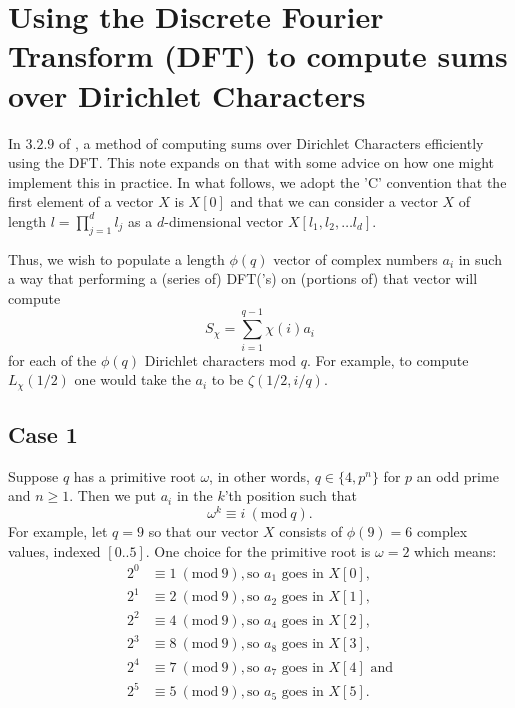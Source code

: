 \documentclass[12pt]{amsart}
\newcommand{\Mod}[1]{\ (\mathrm{mod}\ #1)}
\theoremstyle{remark}
\numberwithin{theorem}{section}
\numberwithin{equation}{section}
\begin{document}
\section{Using the Discrete Fourier Transform (DFT) to compute sums over Dirichlet Characters}

In $3.2.9$ of \cite{Platt2011}, a method of computing sums over Dirichlet Characters efficiently using the DFT. This note expands on that with some advice on how one might implement this in practice. In what follows, we adopt the 'C' convention that the first element of a vector $X$ is $X[0]$ and that we can consider a vector $X$ of length $l=\prod_{j=1}^d l_j$ as a $d$-dimensional vector $X[l_1,l_2,\ldots l_d]$.

Thus, we wish to populate a length $\phi(q)$ vector of complex numbers $a_i$ in such a way that performing a (series of) DFT('s) on (portions of) that vector will compute
$$
S_\chi=\sum\limits_{i=1}^{q-1} \chi(i) a_i
$$
for each of the $\phi(q)$ Dirichlet characters mod $q$. For example, to compute $L_\chi(1/2)$ one would take the $a_i$ to be $\zeta(1/2,i/q)$.

\subsection{Case 1}

Suppose $q$ has a primitive root $\omega$, in other words, $q\in\{4,p^n\}$ for $p$ an odd prime and $n\geq 1$. Then we put $a_i$ in the $k$'th position such that
$$
\omega^k \equiv i \Mod{q}.
$$
For example, let $q=9$ so that our vector $X$ consists of $\phi(9)=6$ complex values, indexed $[0..5]$. One choice for the primitive root is $\omega=2$ which means:
\begin{equation*}
  \begin{split}
    2^0 &\equiv 1\Mod{9}, \textrm{so }a_1\textrm{ goes in } X[0],\\
    2^1 &\equiv 2\Mod{9}, \textrm{so }a_2\textrm{ goes in } X[1],\\
    2^2 &\equiv 4\Mod{9}, \textrm{so }a_4\textrm{ goes in } X[2],\\
    2^3 &\equiv 8\Mod{9}, \textrm{so }a_8\textrm{ goes in } X[3],\\
    2^4 &\equiv 7\Mod{9}, \textrm{so }a_7\textrm{ goes in } X[4] \textrm{ and}\\
    2^5 &\equiv 5\Mod{9}, \textrm{so } a_5\textrm{ goes in } X[5].
  \end{split}
\end{equation*}
\end{document}
